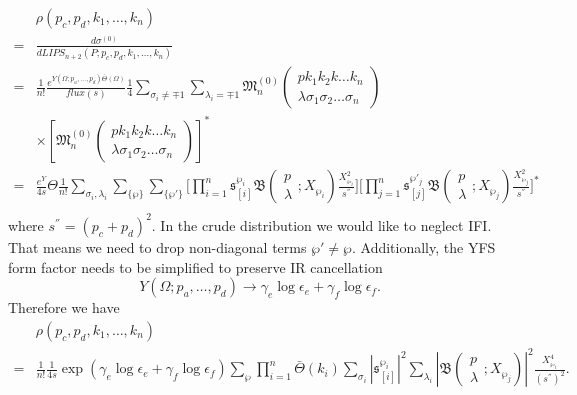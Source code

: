 \begin{align}
&\rho(p_c,p_d,k_1,\ldots,k_n)\nonumber\\
=&\frac{d\sigma^{(0)}}{dLIPS_{n+2}(P;p_c,p_d,k_1,\ldots,k_n)}\nonumber\\
=&\frac{1}{n!}\frac{e^{Y(\Omega;p_a,\ldots,p_d)\bar{\Theta}(\Omega)}}{flux(s)}\frac{1}{4}\sum_{\sigma_i\neq\mp 1}\sum_{\lambda_i=\mp 1}\mathfrak{M}^{(0)}_n\left(\begin{array}{c}
pk_1k_2k\ldots k_n\\\lambda\sigma_1\sigma_2\ldots\sigma_n
\end{array}\right)\nonumber\\
&\times\left[\mathfrak{M}^{(0)}_n\left(\begin{array}{c}
pk_1k_2k\ldots k_n\\\lambda\sigma_1\sigma_2\ldots\sigma_n
\end{array}\right)\right]^\ast\nonumber\\
=&\frac{e^Y}{4s}\Theta\frac{1}{n!}\sum_{\sigma_i,\lambda_i}\sum_{\{\wp\}}\sum_{\{\wp'\}}\biggl[\prod_{i=1}^{n} \mathfrak{s}^{\wp_i}_{[i]}\mathfrak{B}\left(\begin{array}{c}
p\\\lambda
\end{array};X_{\wp_i} \right)\frac{X^2_{\wp_i}}{s^{''}}\biggr]\biggl[\prod_{j=1}^{n} \mathfrak{s}^{\wp'_j}_{[j]}\mathfrak{B}\left(\begin{array}{c}
p\\\lambda
\end{array};X_{\wp_j} \right)\frac{X^2_{\wp_j}}{s^{''}}\biggr]^\ast\nonumber\\
\end{align}
where $s^{''}=(p_c+p_d)^2$. In the crude distribution we would like to neglect IFI. That means we need to drop non-diagonal terms $\wp'\neq\wp$. Additionally,  the YFS form factor needs to be simplified to preserve IR cancellation
 \begin{equation*}
Y(\Omega;p_a,\ldots,p_d)\to\gamma_e\log\epsilon_e+\gamma_f\log\epsilon_f.
\end{equation*}
Therefore we have
\begin{align}
&\rho(p_c,p_d,k_1,\ldots,k_n)\nonumber\\
=&\frac{1}{n!}\frac{1}{4s}\exp(\gamma_e\log\epsilon_e+\gamma_f\log\epsilon_f)\sum_{\wp}\prod_{i=1}^{n}\bar{\Theta}(k_i)\sum_{\sigma_i}\left|\mathfrak{s}^{\wp_i}_{[i]}\right|^2\sum_{\lambda_i}\left|\mathfrak{B}\left(\begin{array}{c}
p\\\lambda
\end{array};X_{\wp_j} \right)\right|^2\frac{X^4_{\wp_i}}{(s^{''})^2}.\nonumber\\
\end{align}

